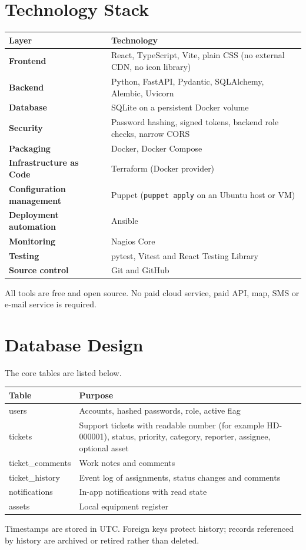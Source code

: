 \documentclass[12pt,a4paper]{article}
\begin{document}
\section{Technology Stack}
\begin{center}
\begin{tabular}{@{}>{\bfseries}p{3.2cm}p{10.5cm}@{}}
\toprule
Layer & Technology\\
\midrule
Frontend & React, TypeScript, Vite, plain CSS (no external CDN, no icon library)\\
Backend & Python, FastAPI, Pydantic, SQLAlchemy, Alembic, Uvicorn\\
Database & SQLite on a persistent Docker volume\\
Security & Password hashing, signed tokens, backend role checks, narrow CORS\\
Packaging & Docker, Docker Compose\\
Infrastructure as Code & Terraform (Docker provider)\\
Configuration management & Puppet (\texttt{puppet apply} on an Ubuntu host or VM)\\
Deployment automation & Ansible\\
Monitoring & Nagios Core\\
Testing & pytest, Vitest and React Testing Library\\
Source control & Git and GitHub\\
\bottomrule
\end{tabular}
\end{center}
All tools are free and open source. No paid cloud service, paid API, map, SMS or e-mail service is required.

\section{Database Design}
The core tables are listed below.
\begin{center}
\begin{tabular}{@{}>{\ttfamily}p{3.4cm}p{10.3cm}@{}}
\toprule
\textrm{\textbf{Table}} & \textbf{Purpose}\\
\midrule
users             & Accounts, hashed passwords, role, active flag\\
tickets           & Support tickets with readable number (for example HD-000001), status, priority, category, reporter, assignee, optional asset\\
ticket\_comments  & Work notes and comments\\
ticket\_history   & Event log of assignments, status changes and comments\\
notifications     & In-app notifications with read state\\
assets            & Local equipment register\\
\bottomrule
\end{tabular}
\end{center}
Timestamps are stored in UTC. Foreign keys protect history; records referenced by history are archived or retired rather than deleted.
\end{document}
